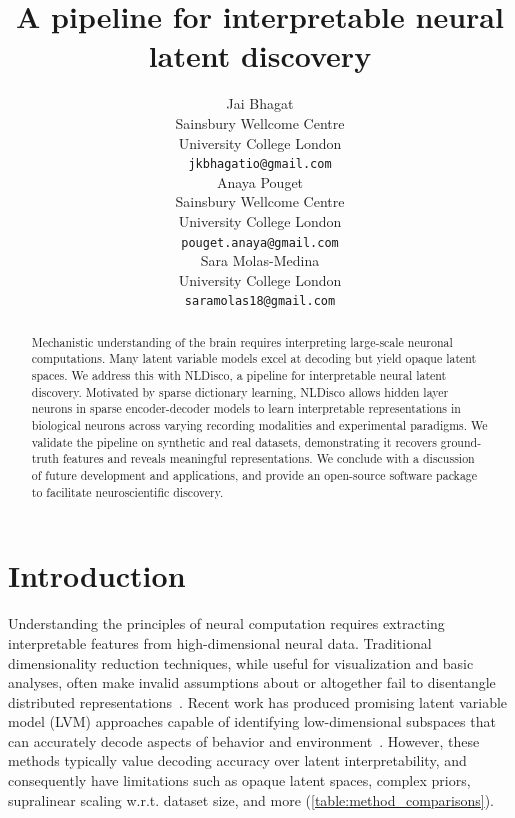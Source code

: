 \documentclass{article}
\title{A pipeline for interpretable neural latent discovery}
\author{
  Jai Bhagat \\
  Sainsbury Wellcome Centre \\
  University College London \\
  \texttt{jkbhagatio@gmail.com} \\
  \And
  Anaya Pouget \\
  Sainsbury Wellcome Centre \\
  University College London \\
  \texttt{pouget.anaya@gmail.com} \\
  \And
  Sara Molas-Medina \\
  University College London \\
  \texttt{saramolas18@gmail.com} \\
}
\begin{document}
\maketitle

\begin{abstract}

Mechanistic understanding of the brain requires interpreting large-scale neuronal computations. Many latent variable models excel at decoding but yield opaque latent spaces. We address this with NLDisco, a pipeline for interpretable neural latent discovery. Motivated by sparse dictionary learning, NLDisco allows hidden layer neurons in sparse encoder-decoder models to learn interpretable representations in biological neurons across varying recording modalities and experimental paradigms. We validate the pipeline on synthetic and real datasets, demonstrating it recovers ground-truth features and reveals meaningful representations. We conclude with a discussion of future development and applications, and provide an open-source software package to facilitate neuroscientific discovery.

\end{abstract}

\section{Introduction}

Understanding the principles of neural computation requires extracting interpretable features from high-dimensional neural data\citep{steinmetz_2021_neuropixels2, raducanu_2017_neuroseeker, cai_2016_miniscope, villette_2019_voltage_2p, ouzounov_2017_three_photon, ahrens_2013_lightsheet}. Traditional dimensionality reduction techniques, while useful for visualization and basic analyses, often make invalid assumptions about or altogether fail to disentangle distributed representations~\citep{cunningham_2014_neural_dr, humphries_2021_dr_principles}. Recent work has produced promising latent variable model (LVM) approaches capable of identifying low-dimensional subspaces that can accurately decode aspects of behavior and environment~\citep{song_2025_langevinflow, schneider_2023_cebra, le_2022_stndt, keshtkaran_2022_autolfads, yu_2009_gpfa, macke_2011_plds, gao_2016_pflds, low_2018_mind, jensen_2020_mgplvm, hernandez_2020_vind, kim_2021_plnde, hurwitz_2021_tndm, schimel_2022_ilqrvae, kudryashova_2023_ctrltndm, ye_2023_ndt2, gondur_2024_mmgpvae, pellegrino_2024_slicetca, sani_2024_dpad, pals_2024_smclr_rnn, zhang_2024_mtm, george_2025_simpl, perkins_2025_mint, schmutz_2025_nce}. However, these methods typically value decoding accuracy over latent interpretability, and consequently have limitations such as opaque latent spaces, complex priors, supralinear scaling w.r.t. dataset size, and more (\autoref{table:method_comparisons}).
\end{document}
